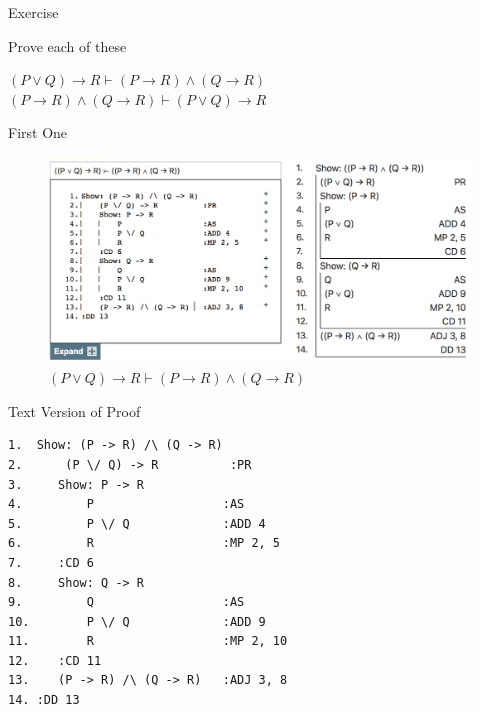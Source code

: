 \documentclass[
  ignorenonframetext,
]{beamer}
\renewcommand{\,}{\text{, }}
\renewenvironment*{quote}	
	{\list{}{\rightmargin   \leftmargin} \item } 	
	{\endlist }
\begin{document}
\begin{frame}{Exercise}
\protect\hypertarget{exercise}{}

Prove each of these

\begin{quote}
\((P \vee Q) \rightarrow R \vdash (P \rightarrow R) \wedge (Q \rightarrow R)\)
\((P \rightarrow R) \wedge (Q \rightarrow R) \vdash (P \vee Q) \rightarrow R\)
\end{quote}

\end{frame}

\begin{frame}{First One}
\protect\hypertarget{first-one}{}

\begin{figure}
\centering
\includegraphics{../images/class05/Class-05-1.png}
\caption{\((P \vee Q) \rightarrow R \vdash (P \rightarrow R) \wedge (Q \rightarrow R)\)}
\end{figure}

\end{frame}

\begin{frame}[fragile]{Text Version of Proof}
\protect\hypertarget{text-version-of-proof}{}

\begin{verbatim}
1.  Show: (P -> R) /\ (Q -> R)
2.      (P \/ Q) -> R          :PR
3.     Show: P -> R
4.         P                  :AS
5.         P \/ Q             :ADD 4
6.         R                  :MP 2, 5
7.     :CD 6
8.     Show: Q -> R
9.         Q                  :AS
10.        P \/ Q             :ADD 9
11.        R                  :MP 2, 10
12.    :CD 11
13.    (P -> R) /\ (Q -> R)   :ADJ 3, 8
14. :DD 13
\end{verbatim}

\end{frame}
\end{document}
